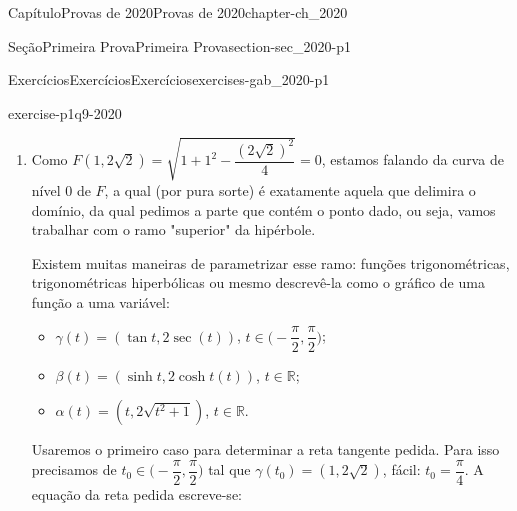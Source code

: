 \documentclass[oneside,10pt,]{book}
\numberwithin{equation}{section}
\newcommand{\R}{\mathbb R}
\begin{document}
\begin{chapterptx}{Capítulo}{Provas de 2020}{}{Provas de 2020}{}{}{chapter-ch_2020}
\begin{sectionptx}{Seção}{Primeira Prova}{}{Primeira Prova}{}{}{section-sec_2020-p1}
\begin{exercises-subsection-numberless}{Exercícios}{Exercícios}{}{Exercícios}{}{}{exercises-gab_2020-p1}
\begin{divisionexercise}{9}{}{}{exercise-p1q9-2020}
\begin{enumerate}[label=\alph*]
\begin{equation*}
\text {Dom}(F)=\big\{(x,y)\in\mathbb R^2\colon
1+x^2-\dfrac{y^2}{4}\geq 0\big\}.
\end{equation*}
Sua representação gráfica corresponte à região entre os ramos da hipérbole \(-x^2+\dfrac{y^2}{4}=1\) (atenção aos eixos fora de escala!): \begin{figureptx}{Figura}{O domínio de \(F\) e a tangente pedida no item abaixo.}{figure-fig_gabp1q91-2020}{}%
\begin{image}{0.25}{0.5}{0.25}{}%
%
\end{image}%
\tcblower
\end{figureptx}%
%
\item{}Como \(F(1,2\sqrt
{2})=\sqrt{1+1^2-\dfrac{(2\sqrt{2})^2}{4}}=0\), estamos falando da curva de nível \(0\) de \(F\), a qual (por pura sorte) é exatamente aquela que delimira o domínio, da qual pedimos a parte que contém o ponto dado, ou seja, vamos trabalhar com o ramo "superior" da hipérbole.%
\par
Existem muitas maneiras de parametrizar esse ramo: funções trigonométricas, trigonométricas hiperbólicas ou mesmo descrevê-la como o gráfico de uma função a uma variável:%
\begin{itemize}[label=\textbullet]
\item{}\(\gamma(t)=(\tan t, 2\sec(t))\), \(t\in
\big(-\dfrac{\pi}{2},\dfrac{\pi}{2}\big)\);%
\item{}\(\beta(t)=(\sinh t, 2\cosh t(t))\), \(t\in\R\);%
\item{}\(\alpha(t)=(t,2\sqrt{t^2+1})\), \(t\in\R\).%
\end{itemize}
%
\par
Usaremos o primeiro caso para determinar a reta tangente pedida. Para isso precisamos de \(t_0\in\big(-\dfrac{\pi}{2},\dfrac{\pi}{2}\big)\) tal que \(\gamma(t_0)=(1,2\sqrt {2})\), fácil: \(t_0=\dfrac{\pi}{4}\). A equação da reta pedida escreve-se:%

\end{enumerate}
\end{divisionexercise}
\end{exercises-subsection-numberless}
\end{sectionptx}
\end{chapterptx}
\end{document}
